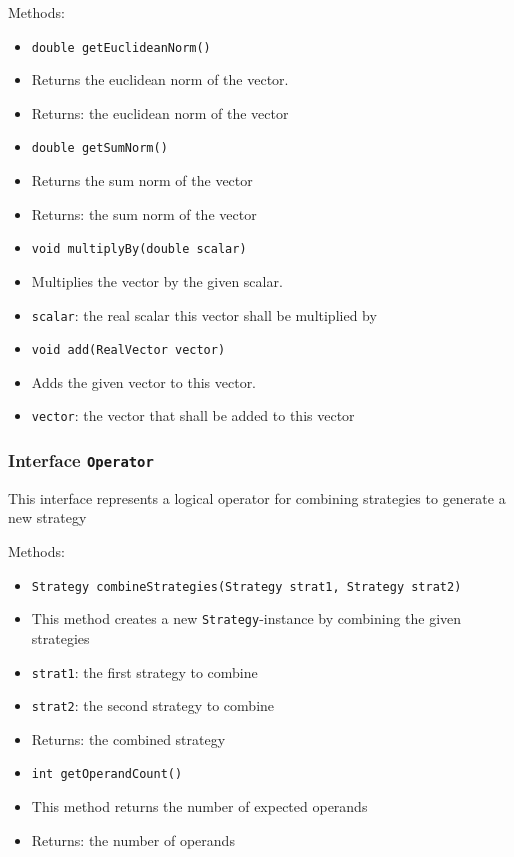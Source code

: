 \documentclass[parskip=full,11pt]{scrartcl}
\begin{document}
Methods:
\begin{itemize}\itemsep -10pt
\item \texttt{double getEuclideanNorm()}
\item[] Returns the euclidean norm of the vector.
\item[] Returns: the euclidean norm of the vector

\item \texttt{double getSumNorm()}
\item[] Returns the sum norm of the vector
\item[] Returns: the sum norm of the vector

\item \texttt{void multiplyBy(double scalar)}
\item[] Multiplies the vector by the given scalar.
\item[] \texttt{scalar}: the real scalar this vector shall be multiplied by

\item \texttt{void add(RealVector vector)}
\item[] Adds the given vector to this vector.
\item[] \texttt{vector}: the vector that shall be added to this vector
\end{itemize}

\subsubsection{Interface \texttt{Operator}}

This interface represents a logical operator for combining strategies to generate a new strategy

Methods:
\begin{itemize}\itemsep -10pt
	\item \texttt{Strategy combineStrategies(Strategy strat1, Strategy strat2)}
	\item[] This method creates a new \texttt{Strategy}-instance by combining the given strategies
	\item[] \texttt{strat1}: the first strategy to combine
	\item[] \texttt{strat2}: the second strategy to combine
	\item[] Returns: the combined strategy
	
	\item \texttt{int getOperandCount()}
	\item[] This method returns the number of expected operands
	\item[] Returns: the number of operands
\end{itemize}
\end{document}
